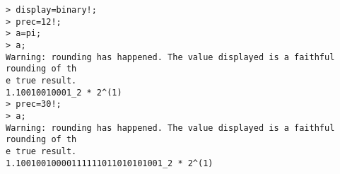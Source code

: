 \begin{center}\begin{minipage}{15cm}\begin{Verbatim}[frame=single]
> display=binary!;
> prec=12!;
> a=pi;
> a;
Warning: rounding has happened. The value displayed is a faithful rounding of th
e true result.
1.10010010001_2 * 2^(1)
> prec=30!;
> a;
Warning: rounding has happened. The value displayed is a faithful rounding of th
e true result.
1.10010010000111111011010101001_2 * 2^(1)
\end{Verbatim}
\end{minipage}\end{center}
